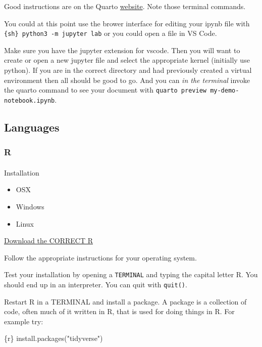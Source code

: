 \documentclass[
  letterpaper,
  DIV=11,
  numbers=noendperiod]{scrreprt}
\makeatletter
\let\oldparagraph\paragraph
\renewcommand{\paragraph}{
    \@ifstar
      \xxxParagraphStar
      \xxxParagraphNoStar
  }
\newcommand{\xxxParagraphStar}[1]{\oldparagraph*{#1}\mbox{}}
\newcommand{\xxxParagraphNoStar}[1]{\oldparagraph{#1}\mbox{}}
\newenvironment{Shaded}{\begin{snugshade}}{\end{snugshade}}
\newcommand{\InformationTok}[1]{\textcolor[rgb]{0.37,0.37,0.37}{#1}}
\providecommand{\tightlist}{%
  \setlength{\itemsep}{0pt}\setlength{\parskip}{0pt}}\usepackage{longtable,booktabs,array}
\makeatother
\begin{document}
Good instructions are on the Quarto
\href{https://quarto.org/docs/tools/vscode-notebook.html}{website}. Note
those terminal commands.

You could at this point use the brower interface for editing your ipynb
file with \texttt{\{sh\}\ python3\ -m\ jupyter\ lab} or you could open a
file in VS Code.

Make sure you have the jupyter extension for vscode. Then you will want
to create or open a new jupyter file and select the appropriate kernel
(initially use python). If you are in the correct directory and had
previously created a virtual environment then all should be good to go.
And you can \emph{in the terminal} invoke the quarto command to see your
document with \texttt{quarto\ preview\ my-demo-notebook.ipynb}.

\subsection{Languages}\label{languages-1}

\subsubsection{R}\label{r}

\paragraph{Installation}\label{installation}

\begin{itemize}
\tightlist
\item
  OSX
\item
  Windows
\item
  Linux
\end{itemize}

\href{https://cran.r-project.org/downloads}{Download the CORRECT R}

Follow the appropriate instructions for your operating system.

Test your installation by opening a \texttt{TERMINAL} and typing the
capital letter R. You should end up in an interpreter. You can quit with
\texttt{quit()}.

Restart R in a TERMINAL and install a package. A package is a collection
of code, often much of it written in R, that is used for doing things in
R. For example try:

\begin{Shaded}
\begin{Highlighting}[]
\InformationTok{\textasciigrave{}\textasciigrave{}\textasciigrave{}\{r\}}
\InformationTok{install.packages("tidyverse")}
\InformationTok{\textasciigrave{}\textasciigrave{}\textasciigrave{}}
\end{Highlighting}
\end{Shaded}
\end{document}

